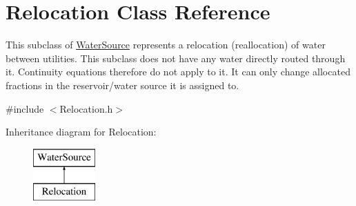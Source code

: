 \hypertarget{classRelocation}{}\section{Relocation Class Reference}
\label{classRelocation}


This subclass of \mbox{\hyperlink{classWaterSource}{Water\+Source}} represents a relocation (reallocation) of water between utilities. This subclass does not have any water directly routed through it. Continuity equations therefore do not apply to it. It can only change allocated fractions in the reservoir/water source it is assigned to.  




{\ttfamily \#include $<$Relocation.\+h$>$}

Inheritance diagram for Relocation\+:\begin{figure}[H]
\begin{center}
\leavevmode
\includegraphics[height=2.000000cm]{classRelocation}
\end{center}
\end{figure}
